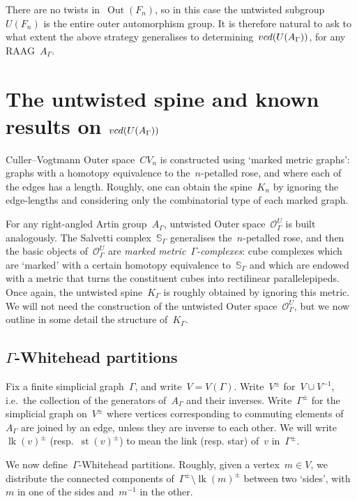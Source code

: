 \documentclass[11pt]{amsart}
\theoremstyle{definition}
\theoremstyle{definition}
\theoremstyle{definition}
\theoremstyle{definition}
\newcommand{\raag}{A_\Gamma} %
\newcommand{\vcduag}{\textsc{vcd}(U(A_{\Gamma}))} %
\newcommand{\link}[1]{\operatorname{lk}({#1})} %
\newcommand{\str}[1]{\operatorname{st}({#1})} %
\newcommand{\spine}{K_{\Gamma}} %
\begin{document}
There are no twists in~$\operatorname{Out}(F_n)$, so in this case the untwisted subgroup~$U(F_n)$ is the entire outer automorphism group. It is therefore natural to ask to what extent the above strategy generalises to determining~$\vcduag$, for any RAAG~$\raag$.

\section{The untwisted spine and known results on \texorpdfstring{$\vcduag$}{vcd of untwisted subgroup}}\label{sec:untwisted spine}

Culler--Vogtmann Outer space~$CV_n$ is constructed using `marked metric graphs': graphs with a homotopy equivalence to the~$n$-petalled rose, and where each of the edges has a length. Roughly, one can obtain the spine~$K_n$ by ignoring the edge-lengths and considering only the combinatorial type of each marked graph. 

For any right-angled Artin group~$\raag$, untwisted Outer space~$\mathcal{O}_\Gamma^U$ is built analogously. The Salvetti complex~$\mathbb{S}_\Gamma$ generalises the~$n$-petalled rose, and then the basic objects of~$\mathcal{O}_\Gamma^U$ are \emph{marked metric~$\Gamma$-complexes}: cube complexes which are `marked' with a certain homotopy equivalence to~$\mathbb{S}_\Gamma$ and which are endowed with a metric that turns the constituent cubes into rectilinear parallelepipeds. Once again, the untwisted spine~$\spine$ is roughly obtained by ignoring this metric. We will not need the construction of the untwisted Outer space~$\mathcal{O}_\Gamma^U$, but we now outline in some detail the structure of~$\spine$.

\subsection{$\Gamma$-Whitehead partitions}\label{subsec:Gamma-Whitehead partitions}

Fix a finite simplicial graph~$\Gamma$, and write~$V = V(\Gamma)$. Write~$V^\pm$ for~$V \cup V^{-1}$, i.e.~the collection of the generators of~$\raag$ and their inverses. Write~$\Gamma^\pm$ for the simplicial graph on~$V^\pm$ where vertices corresponding to commuting elements of~$\raag$ are joined by an edge, unless they are inverse to each other. We will write~$\link{v}^\pm$ (resp.~$\str{v}^\pm$) to mean the link (resp. star) of~$v$ in~$\Gamma^\pm$.

We now define~$\Gamma$-Whitehead partitions. Roughly, given a vertex~$m \in V$, we distribute the connected components of~$\Gamma^\pm \setminus \link{m}^\pm$ between two `sides', with~$m$ in one of the sides and~$m^{-1}$ in the other. 
\end{document}

